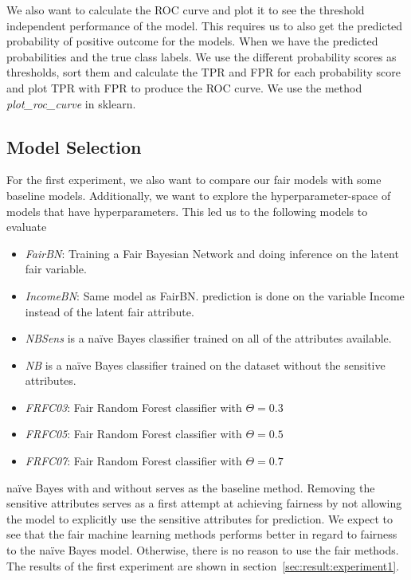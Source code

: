 We also want to calculate the ROC curve and plot it to see the threshold independent performance of the model. This requires us to also get the predicted probability of positive outcome for the models. When we have the predicted probabilities and the true class labels. We use the different probability scores as thresholds, sort them and calculate the TPR and FPR for each probability score and plot TPR with FPR to produce the ROC curve. We use the method \emph{plot\_roc\_curve} in sklearn.

\subsection{Model Selection}

For the first experiment, we also want to compare our fair models with some baseline models. Additionally, we want to explore the hyperparameter-space of models that have hyperparameters. This led us to the following models to evaluate

\begin{itemize}
    \item \emph{FairBN}: Training a Fair Bayesian Network and doing inference on the latent fair variable.
    \item  \emph{IncomeBN}: Same model as FairBN. prediction is done on the variable Income instead of the latent fair attribute.
    \item \emph{NBSens} is a naïve Bayes classifier trained on all of the attributes available.
    \item \emph{NB} is a naïve Bayes classifier trained on the dataset without the sensitive attributes.
    \item \emph{FRFC03}: Fair Random Forest classifier with $\Theta = 0.3$
    \item \emph{FRFC05}: Fair Random Forest classifier with $\Theta = 0.5$
    \item \emph{FRFC07}: Fair Random Forest classifier with $\Theta = 0.7$
\end{itemize}

naïve Bayes with and without serves as the baseline method. Removing the sensitive attributes serves as a first attempt at achieving fairness by not allowing the model to explicitly use the sensitive attributes for prediction. We expect to see that the fair machine learning methods performs better in regard to fairness to the naïve Bayes model. Otherwise, there is no reason to use the fair methods. The results of the first experiment are shown in section~\ref{sec:result:experiment1}.

